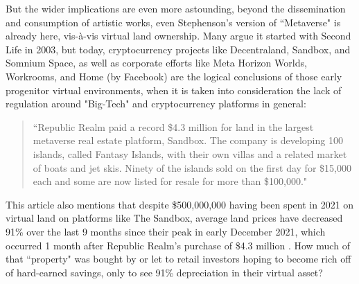 But the wider implications are even more astounding, beyond the dissemination and consumption of artistic works, even Stephenson's version of ``Metaverse" is already here, vis-à-vis virtual land ownership. Many argue it started with Second Life in 2003, but today, cryptocurrency projects like Decentraland, Sandbox, and Somnium Space, as well as corporate efforts like Meta Horizon Worlds, Workrooms, and Home (by Facebook) are the logical conclusions of those early progenitor virtual environments, when it is taken into consideration the lack of regulation around "Big-Tech" and cryptocurrency platforms in general:
\begin{quote}
    ``Republic Realm paid a record \$4.3 million for land in the largest metaverse real estate platform, Sandbox. The company is developing 100 islands, called Fantasy Islands, with their own villas and a related market of boats and jet skis. Ninety of the islands sold on the first day for \$15,000 each and some are now listed for resale for more than \$100,000." \citep[]{frank2022}
\end{quote}
This article also mentions that despite \$500,000,000 having been spent in 2021 on virtual land on platforms like The Sandbox, average land prices have decreased 91\% over the last 9 months since their peak in early December 2021, which occurred 1 month after Republic Realm's purchase of \$4.3 million \citep[]{kane2022}. How much of that ``property" was bought by or let to retail investors hoping to become rich off of hard-earned savings, only to see 91\% depreciation in their virtual asset? 

